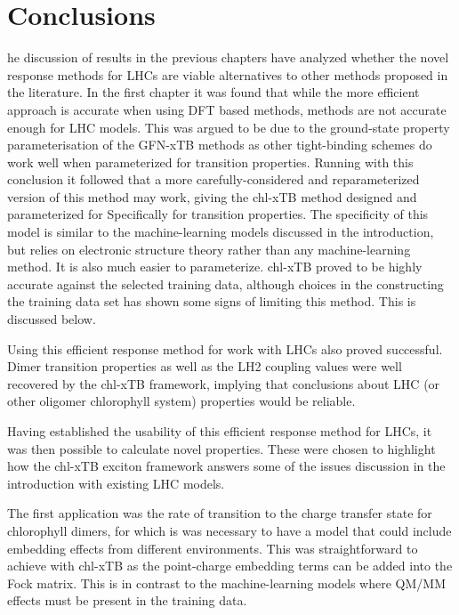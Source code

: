 %
%
\let\textcircled=\pgftextcircled
\chapter{Conclusions}
\label{chap:discussion}

he discussion of results in the previous chapters have analyzed whether
the novel response methods for LHCs are viable alternatives to other methods proposed
in the literature. In the first chapter it was found that while the more efficient 
\dscf approach is accurate when using DFT based methods, \dxtb methods are not accurate 
enough for LHC models. This was argued to be due to the ground-state property parameterisation
of the GFN-xTB methods as other tight-binding schemes do work well when parameterized 
for transition properties. Running with this conclusion it followed that a more 
carefully-considered and reparameterized version of this method may work, giving 
the chl-xTB method designed and parameterized for Specifically for \Qy transition 
properties. The specificity of this model is similar to the machine-learning models
discussed  in the introduction, but relies on electronic structure theory rather 
than any machine-learning method. It is also much easier to parameterize. chl-xTB 
proved to be highly accurate against the selected training data, although choices 
in the constructing the training data set has shown some signs of limiting this
method. This is discussed below. 

Using this efficient response method for work with LHCs also proved successful. 
Dimer transition properties as well as the LH2 coupling values were well recovered 
by the chl-xTB framework, implying that conclusions about LHC (or other oligomer
chlorophyll system) properties would be reliable.

Having established the usability of this efficient response method for LHCs, it
was then possible to calculate novel properties. These were chosen to highlight 
how the chl-xTB exciton framework answers some of the issues discussion in the introduction
with existing LHC models. 

The first application was the rate of transition to the charge transfer state for
chlorophyll dimers, for which is was necessary to have a model that could include 
embedding effects from different environments. This was straightforward to achieve 
with chl-xTB as the point-charge embedding terms can be added into the Fock matrix. 
This is in contrast to the machine-learning models where QM/MM effects must be present 
in the training data. 

